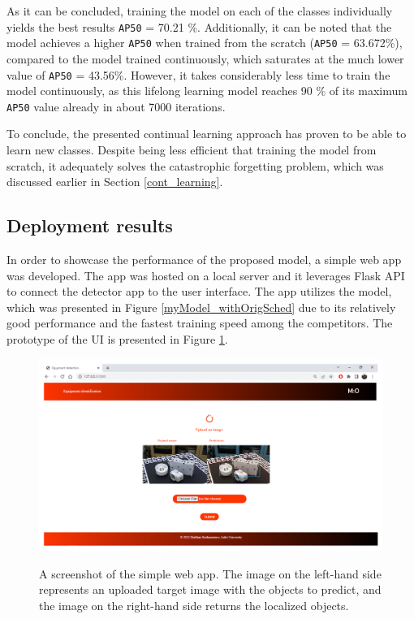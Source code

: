 As it can be concluded, training the model on each of the classes individually yields the best results \texttt{AP50} = 70.21 \%. Additionally, it can be noted that the model achieves a higher \texttt{AP50} when trained from the scratch (\texttt{AP50} = 63.672\%), compared to the model trained continuously, which saturates at the much lower value of \texttt{AP50} = 43.56\%. However, it takes considerably less time to train the model continuously, as this lifelong learning model reaches 90 \% of its maximum \texttt{AP50} value already in about 7000 iterations.


To conclude, the presented continual learning approach has proven to be able to learn new classes. Despite being less efficient that training the model from scratch, it adequately solves the catastrophic forgetting problem, which was discussed earlier in Section \ref{cont_learning}.

\FloatBarrier
\clearpage
\subsection{Deployment results}
\FloatBarrier
In order to showcase the performance of the proposed model, a simple web app was developed. The app was hosted on a local server and it leverages Flask API to connect the detector app to the user interface. The app utilizes the model, which was presented in Figure \ref{myModel_withOrigSched} due to its relatively good performance and the fastest training speed among the competitors. The prototype of the UI is presented in Figure \ref{demo}. 

\begin{figure}[htb]
	\begin{center}
		\includegraphics[width=14cm]{./demo.png}
	\end{center}
	\caption{A screenshot of the simple web app. The image on the left-hand side represents an uploaded target image with the objects to predict, and the image on the right-hand side returns the localized objects.}
	\begin{center}
		\label{demo}
	\end{center}
\end{figure}

